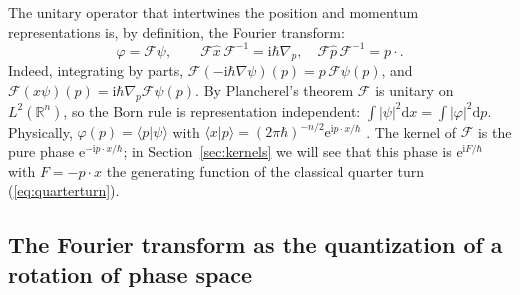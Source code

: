 \documentclass[11pt,a4paper]{article}
\newcommand{\R}{\mathbb{R}}
\newcommand{\ii}{\mathrm{i}}
\newcommand{\dd}{\mathrm{d}}
\newcommand{\ee}{\mathrm{e}}
\newcommand{\hb}{\hbar}
\newcommand{\op}[1]{\hat{#1}}
\newcommand{\braket}[2]{\langle #1|#2\rangle}
\newcommand{\FT}{\mathcal{F}}
\theoremstyle{plain}
\theoremstyle{definition}
\theoremstyle{remark}
\begin{document}
The unitary operator that intertwines the position and momentum representations is, by definition, the Fourier transform:
\begin{equation}
\varphi=\FT\psi,\qquad \FT\op x\,\FT^{-1}=\ii\hb\nabla_p,\quad \FT\op p\,\FT^{-1}=p\cdot .
\end{equation}
Indeed, integrating by parts, $\FT(-\ii\hb\nabla\psi)(p)=p\,\FT\psi(p)$, and $\FT(x\psi)(p)=\ii\hb\nabla_p\FT\psi(p)$. By Plancherel's theorem $\FT$ is unitary on $L^2(\R^n)$, so the Born rule is representation independent: $\int|\psi|^2\dd x=\int|\varphi|^2\dd p$. Physically, $\varphi(p)=\braket{p}{\psi}$ with $\braket{x}{p}=(2\pi\hb)^{-n/2}\ee^{\ii p\cdot x/\hb}$ \cite{Dirac}. The kernel of $\FT$ is the pure phase $\ee^{-\ii p\cdot x/\hb}$; in Section~\ref{sec:kernels} we will see that this phase is $\ee^{\ii F/\hb}$ with $F=-p\cdot x$ the generating function of the classical quarter turn (\ref{eq:quarterturn}).

\subsection{The Fourier transform as the quantization of a rotation of phase space}\label{sec:HOFT}
\end{document}
